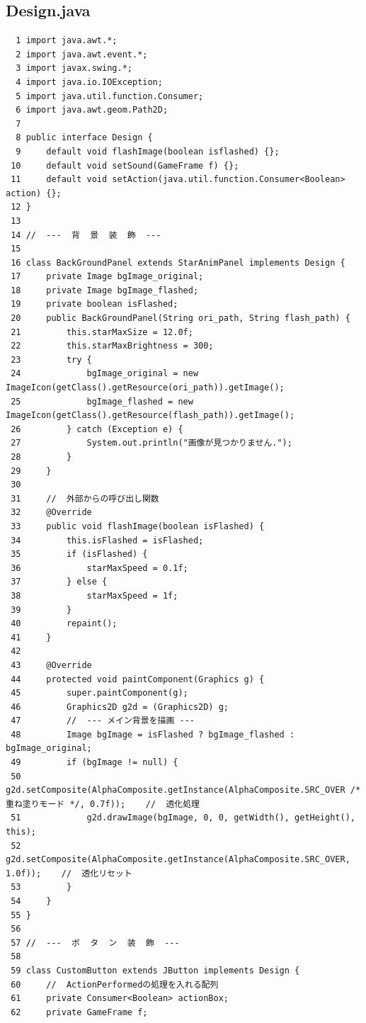 \documentclass[11pt,a4j]{jarticle}
\begin{document}
\subsection*{Design.java}
\begin{small}
\begin{verbatim}
  1 import java.awt.*;
  2 import java.awt.event.*;
  3 import javax.swing.*;
  4 import java.io.IOException;
  5 import java.util.function.Consumer;
  6 import java.awt.geom.Path2D;
  7 
  8 public interface Design {
  9     default void flashImage(boolean isflashed) {};
 10     default void setSound(GameFrame f) {};
 11     default void setAction(java.util.function.Consumer<Boolean> action) {};
 12 }
 13 
 14 //  ---  背  景  装  飾  ---
 15 
 16 class BackGroundPanel extends StarAnimPanel implements Design {
 17     private Image bgImage_original;
 18     private Image bgImage_flashed;
 19     private boolean isFlashed;
 20     public BackGroundPanel(String ori_path, String flash_path) {
 21         this.starMaxSize = 12.0f;
 22         this.starMaxBrightness = 300;
 23         try {
 24             bgImage_original = new ImageIcon(getClass().getResource(ori_path)).getImage();
 25             bgImage_flashed = new ImageIcon(getClass().getResource(flash_path)).getImage();
 26         } catch (Exception e) {
 27             System.out.println("画像が見つかりません.");
 28         }
 29     }
 30 
 31     //  外部からの呼び出し関数
 32     @Override
 33     public void flashImage(boolean isFlashed) {
 34         this.isFlashed = isFlashed;
 35         if (isFlashed) {
 36             starMaxSpeed = 0.1f;
 37         } else {
 38             starMaxSpeed = 1f;
 39         }
 40         repaint();
 41     }
 42 
 43     @Override
 44     protected void paintComponent(Graphics g) {
 45         super.paintComponent(g);
 46         Graphics2D g2d = (Graphics2D) g;
 47         //  --- メイン背景を描画 ---
 48         Image bgImage = isFlashed ? bgImage_flashed : bgImage_original;
 49         if (bgImage != null) {
 50             g2d.setComposite(AlphaComposite.getInstance(AlphaComposite.SRC_OVER /*重ね塗りモード */, 0.7f));    //  透化処理
 51             g2d.drawImage(bgImage, 0, 0, getWidth(), getHeight(), this);
 52             g2d.setComposite(AlphaComposite.getInstance(AlphaComposite.SRC_OVER, 1.0f));    //  透化リセット
 53         }
 54     }
 55 }
 56 
 57 //  ---  ボ  タ  ン  装  飾  ---
 58 
 59 class CustomButton extends JButton implements Design {
 60     //  ActionPerformedの処理を入れる配列
 61     private Consumer<Boolean> actionBox;
 62     private GameFrame f;

\end{verbatim}
\end{small}
\end{document}
